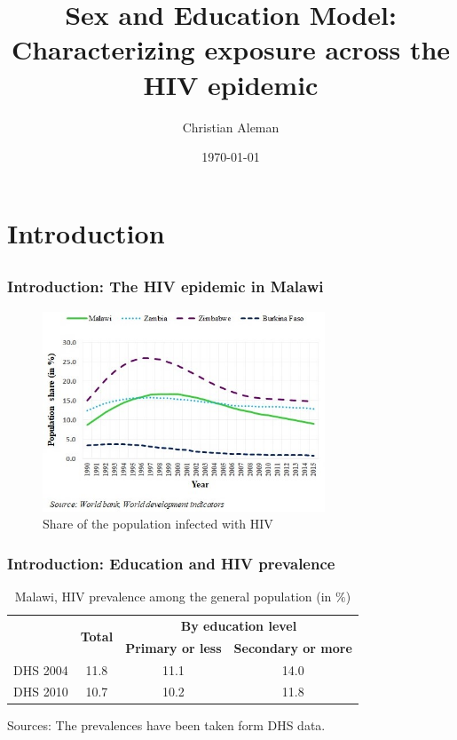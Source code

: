 \documentclass{beamer}
\title[Sex and Education Model \,\,\,\,\,\,\,\,\,\,\,\,\,\,\,\,\,\,\,\,\,\,\,\,\,\,\,\,\,\,\,\,\,\,\,\,\,\,\,\,\,\,\,\,\,\,\,\,\,\,\,\,\,\,\,\,\,\,\,\,\,\,\,\,\,\,\,\,\,\,\,\,\,\,\,\,\,\,\,\,\,\,\,\,\,\,\,\,\,\,\,\,\,\,\,\,\,\,\,\,\,\,\,\,\,\,\,\,\,\,\,\,\,\,\,\,\,\,\,\,\,\,\,\,\,\,\,\,\,\,\,\,\,\,\,\,\,\,\,\,\,\,\,\,\,\,\,\,\,\,\,\,\,\,\,\,\,\,\,\,\,\,\,\,\,\,\,\,\,\,\,\,\,\,\,\,\,\,\,\,\,\,\,\,\,\,\,\,\,\,\,\,\,\,\,\,\,\,\,\,\,\,\,\,\,\,\,\,\,\,\,\,\,\,\,\,\,\,\,\,\,\,\,\,\,\,\,\,\,\,\,\,\insertframenumber/\inserttotalframenumber]{Sex and Education Model: \\Characterizing exposure across the HIV epidemic } %
\author{Christian Aleman}
\institute[UAB-IDEA] %
{
Advisor: Raul Santaeulalia-Llopis\\
Universitat Aut\`{o}noma de Barcelona \\ 
IDEA-QEM\\%
\medskip
\textit{} %
}
\date{\today} %
\begin{document}
\begin{frame}
\titlepage %
\end{frame}

\begin{frame}
\tableofcontents
\end{frame}



\section{Introduction}
\subsection{}



\begin{frame}
\frametitle{Introduction: The HIV epidemic in Malawi}
\begin{figure}
  \centering
  \caption{Share of the population infected with HIV}
   \includegraphics[width=0.75\textwidth]{malawi11.jpg}
 \end{figure}
\end{frame}

\begin{frame}
\frametitle{Introduction: Education and HIV prevalence}
\begin{table}
\centering
\caption{Malawi, HIV prevalence among the general population (in $\%$)}
\label{tablefinal1}
\begin{tabular}{c|c|c|c}
\hline
\multirow{2}{*}{\textbf{}}&\multirow{2}{*}{\textbf{Total}}&\multicolumn{2}{|c}{\textbf{By education level}}\\
\cline{3-4}
 &   &  \textbf{Primary or less}&  \textbf{Secondary or more}\\
 \hline \hline
 DHS 2004& 11.8 & 11.1 & 14.0 \\
 [0.3em]
 DHS 2010    & 10.7 & 10.2 & 11.8 \\
 [0.3em]
\hline \hline
\end{tabular}
\begin{flushleft}
Sources: The prevalences have been taken form DHS data.
\end{flushleft}
\end{table}
\end{frame}
\end{document}
